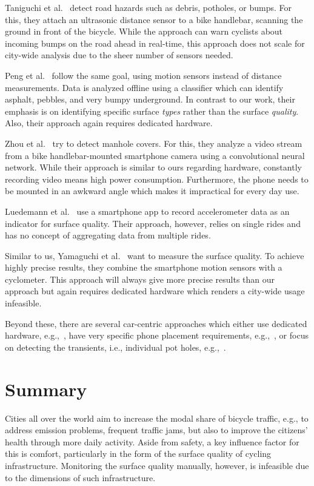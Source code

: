 Taniguchi et al.~\cite{taniguchi2015evaluation} detect road hazards such as debris, potholes, or bumps.
For this, they attach an ultrasonic distance sensor to a bike handlebar, scanning the ground in front of the bicycle.
While the approach can warn cyclists about incoming bumps on the road ahead in real-time, this approach does not scale for city-wide analysis due to the sheer number of sensors needed.

Peng et al.~\cite{peng2019road} follow the same goal, using motion sensors instead of distance measurements.
Data is analyzed offline using a classifier which can identify asphalt, pebbles, and very bumpy underground.
In contrast to our work, their emphasis is on identifying specific surface \textit{types} rather than the surface \textit{quality}.
Also, their approach again requires dedicated hardware.

Zhou et al.~\cite{zhou2022smartphone} try to detect manhole covers.
For this, they analyze a video stream from a bike handlebar-mounted smartphone camera using a convolutional neural network.
While their approach is similar to ours regarding hardware, constantly recording video means high power consumption.
Furthermore, the phone needs to be mounted in an awkward angle which makes it impractical for every day use.

Luedemann et al.~\cite{luedemann2022bikevibes} use a smartphone app to record accelerometer data as an indicator for surface quality.
Their approach, however, relies on single rides and has no concept of aggregating data from multiple rides.

Similar to us, Yamaguchi et al.~\cite{yamaguchi2015simple} want to measure the surface quality.
To achieve highly precise results, they combine the smartphone motion sensors with a cyclometer.
This approach will always give more precise results than our approach but again requires dedicated hardware which renders a city-wide usage infeasible.

Beyond these, there are several car-centric approaches which either use dedicated hardware, e.g.,~\cite{chen2013crsm}, have very specific phone placement requirements, e.g.,~\cite{daraghmi2020crowdsourcing}, or focus on detecting the transients, i.e., individual pot holes, e.g.,~\cite{alam2020crowdsourcing,li2014crowdsourcing,lima2016using}.


\section{Summary}
\label{sec:summary_cyclequality}
Cities all over the world aim to increase the modal share of bicycle traffic, e.g., to address emission problems, frequent traffic jams, but also to improve the citizens' health through more daily activity.
Aside from safety, a key influence factor for this is comfort, particularly in the form of the surface quality of cycling infrastructure.
Monitoring the surface quality manually, however, is infeasible due to the dimensions of such infrastructure.

